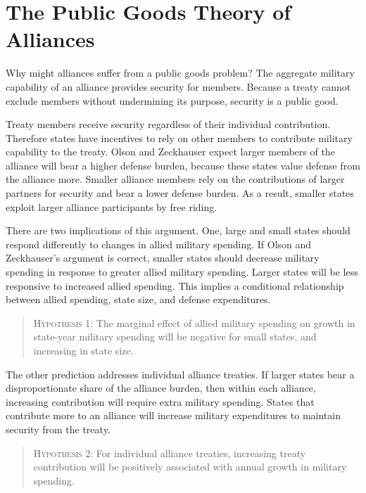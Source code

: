\documentclass[12pt]{article}
\begin{document}
\section{The Public Goods Theory of Alliances}


Why might alliances suffer from a public goods problem? 
The aggregate military capability of an alliance provides security for members. 
Because a treaty cannot exclude members without undermining its purpose, security is a public good. 


Treaty members receive security regardless of their individual contribution. 
Therefore states have incentives to rely on other members to contribute military capability to the treaty. 
Olson and Zeckhauser expect larger members of the alliance will bear a higher defense burden, because these states value defense from the alliance more. 
Smaller alliance members rely on the contributions of larger partners for security and bear a lower defense burden.
As a result, smaller states exploit larger alliance participants by free riding. 


There are two implications of this argument. 
One, large and small states should respond differently to changes in allied military spending. 
If Olson and Zeckhauser's argument is correct, smaller states should decrease military spending in response to greater allied military spending. 
Larger states will be less responsive to increased allied spending. 
This implies a conditional relationship between allied spending, state size, and defense expenditures. 


\begin{quote}
\textsc{Hypothesis 1}: The marginal effect of allied military spending on growth in state-year military spending will be negative for small states, and increasing in state size. 
\end{quote}


The other prediction addresses individual alliance treaties. 
If larger states bear a disproportionate share of the alliance burden, then within each alliance, increasing contribution will require extra military spending. 
States that contribute more to an alliance will increase military expenditures to maintain security from the treaty. 


\begin{quote}
\textsc{Hypothesis 2}: For individual alliance treaties, increasing treaty contribution will be positively associated with annual growth in military spending. 
\end{quote}
\end{document}
